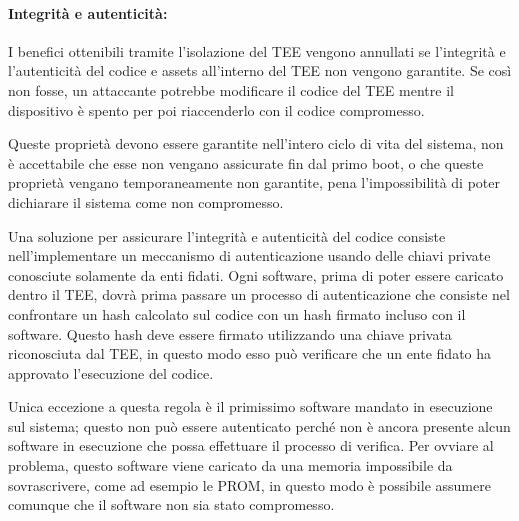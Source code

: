 \documentclass[12pt,italian]{report}
\begin{document}

\paragraph{Integrità e autenticità:}
I benefici ottenibili tramite l'isolazione del TEE vengono annullati se
l'integrità e l'autenticità del codice e assets all'interno del TEE non
vengono garantite. Se così non fosse, un attaccante potrebbe modificare
il codice del TEE mentre il dispositivo è spento per poi riaccenderlo con
il codice compromesso.

Queste proprietà devono essere garantite nell'intero ciclo di vita del
sistema, non è accettabile che esse non vengano assicurate fin dal primo boot,
o che queste proprietà vengano temporaneamente non garantite, pena
l'impossibilità di poter dichiarare il sistema come non compromesso.

Una soluzione per assicurare l'integrità e autenticità del codice consiste
nell'implementare un meccanismo di autenticazione usando delle chiavi
private conosciute solamente da enti fidati.
Ogni software, prima di poter essere caricato dentro il TEE, dovrà prima
passare un processo di autenticazione che consiste nel confrontare un hash
calcolato sul codice con un hash firmato incluso con il software.
Questo hash deve essere firmato utilizzando una chiave privata riconosciuta
dal TEE, in questo modo esso può verificare che un ente fidato ha approvato
l'esecuzione del codice.

Unica eccezione a questa regola è il primissimo software mandato in esecuzione
sul sistema; questo non può essere autenticato perché non è ancora presente
alcun software in esecuzione che possa effettuare il processo di verifica.
Per ovviare al problema, questo software viene caricato da una memoria
impossibile da sovrascrivere, come ad esempio le PROM, in questo modo è
possibile assumere comunque che il software non sia stato compromesso.
\end{document}
